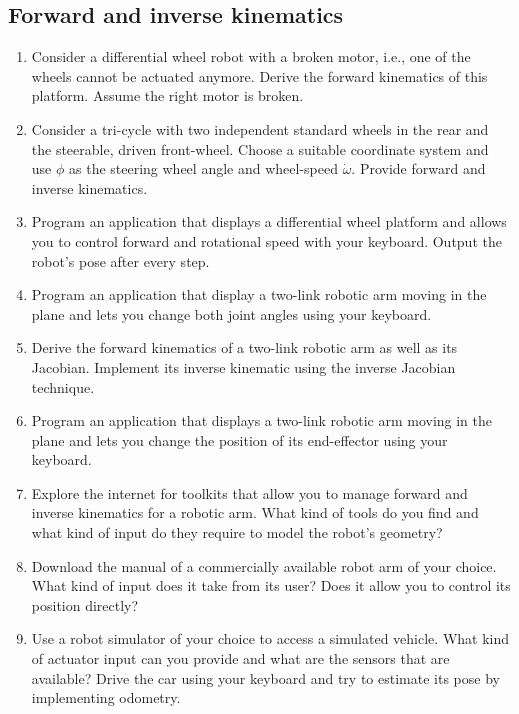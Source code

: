 \subsection*{Forward and inverse kinematics}
\begin{enumerate}
\item Consider a differential wheel robot with a broken motor, i.e., one of the wheels cannot be actuated anymore. Derive the forward kinematics of this platform. Assume the right motor is broken.
\item Consider a tri-cycle with two independent standard wheels in the rear and the steerable, driven front-wheel. Choose a suitable coordinate system and use $\phi$ as the steering wheel angle and wheel-speed $\dot{\omega}$. Provide forward and inverse kinematics.
\item Program an application that displays a differential wheel platform and allows you to control forward and rotational speed with your keyboard. Output the robot's pose after every step.
\item Program an application that display a two-link robotic arm moving in the plane and lets you change both joint angles using your keyboard.
\item Derive the forward kinematics of a two-link robotic arm as well as its Jacobian. Implement its inverse kinematic using the inverse Jacobian technique.
\item Program an application that displays a two-link robotic arm moving in the plane and lets you change the position of its end-effector using your keyboard.
\item Explore the internet for toolkits that allow you to manage forward and inverse kinematics for a robotic arm. What kind of tools do you find and what kind of input do they require to model the robot's geometry?
\item Download the manual of a commercially available robot arm of your choice. What kind of input does it take from its user? Does it allow you to control its position directly?
\item Use a robot simulator of your choice to access a simulated vehicle. What kind of actuator input can you provide and what are the sensors that are available? Drive the car using your keyboard and try to estimate its pose by implementing odometry.
\end{enumerate}
\normalsize

